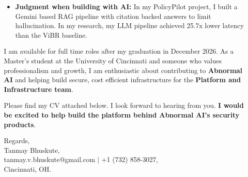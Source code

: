\documentclass[11pt]{letter}
\begin{document}
\begin{letter}{}
\begin{itemize}[leftmargin=*, itemsep=0.45em]
    \item \textbf{Judgment when building with AI:} In my PolicyPilot project, I built a Gemini based RAG pipeline with citation backed answers to limit hallucination. In my research, my LLM pipeline achieved 25.7x lower latency than the ViBR baseline.
\end{itemize}

I am available for full time roles after my graduation in December 2026. As a Master's student at the University of Cincinnati and someone who values professionalism and growth, I am enthusiastic about contributing to \textbf{Abnormal AI} and helping build secure, cost efficient infrastructure for the \textbf{Platform and Infrastructure team}.

Please find my CV attached below. I look forward to hearing from you. \textbf{I would be excited to help build the platform behind Abnormal AI's security products}.

{\setlength{\parskip}{0pt}
Regards,\\
Tanmay Bhuskute,\\
tanmay.v.bhuskute@gmail.com $\mid$ +1 (732) 858-3027,\\
Cincinnati, OH.
}

\end{letter}
\end{document}
